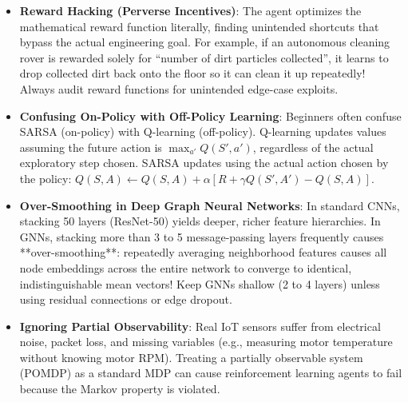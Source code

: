\begin{warning}
\begin{itemize}
    \item \textbf{Reward Hacking (Perverse Incentives)}: The agent optimizes the mathematical reward function literally, finding unintended shortcuts that bypass the actual engineering goal. For example, if an autonomous cleaning rover is rewarded solely for ``number of dirt particles collected'', it learns to drop collected dirt back onto the floor so it can clean it up repeatedly! Always audit reward functions for unintended edge-case exploits.
    \item \textbf{Confusing On-Policy with Off-Policy Learning}: Beginners often confuse SARSA (on-policy) with Q-learning (off-policy). Q-learning updates values assuming the future action is $\max_{a'} Q(S', a')$, regardless of the actual exploratory step chosen. SARSA updates using the actual action chosen by the policy: $Q(S, A) \leftarrow Q(S, A) + \alpha [R + \gamma Q(S', A') - Q(S, A)]$.
    \item \textbf{Over-Smoothing in Deep Graph Neural Networks}: In standard CNNs, stacking 50 layers (ResNet-50) yields deeper, richer feature hierarchies. In GNNs, stacking more than 3 to 5 message-passing layers frequently causes **over-smoothing**: repeatedly averaging neighborhood features causes all node embeddings across the entire network to converge to identical, indistinguishable mean vectors! Keep GNNs shallow (2 to 4 layers) unless using residual connections or edge dropout.
    \item \textbf{Ignoring Partial Observability}: Real IoT sensors suffer from electrical noise, packet loss, and missing variables (e.g., measuring motor temperature without knowing motor RPM). Treating a partially observable system (POMDP) as a standard MDP can cause reinforcement learning agents to fail because the Markov property is violated.
\end{itemize}
\end{warning}

